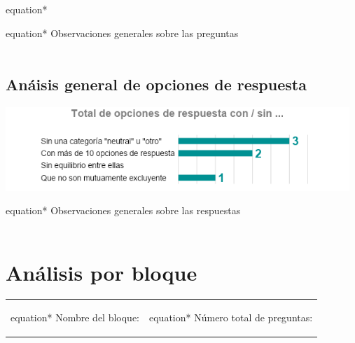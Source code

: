 \documentclass[10,a4paperpaper,]{article}
\begin{document}
\begin{center}
    \begin{mybox}[colback=white, width = 7cm]{equation*}
    \end{mybox}
\end{center}

\begin{center}
  \begin{mybox}[colback=white, width = 7cm]{equation*}
    Observaciones generales sobre las preguntas \\
    \\
  \end{mybox}
\end{center}

\newpage

\subsection{Anáisis general de opciones de respuesta}

\begin{center}
    \includegraphics[width=13cm]{figures/Caftsq.png} 
    \begin{mybox}[colback=white, width = 7cm]{equation*}
    Observaciones generales sobre las respuestas \\
    \\
    \end{mybox}
\end{center}

\section{Análisis por bloque}

\begin{center}
    \begin{tabular}{ c  c }
      \begin{mybox}[colback=white, width = 7cm]{equation*}
      Nombre del bloque: 
      \end{mybox}
      & 
      \begin{mybox}[colback=white, width = 7cm]{equation*}
      Número total de preguntas: 
      \end{mybox}
    \end{tabular}
\end{center}
\end{document}

